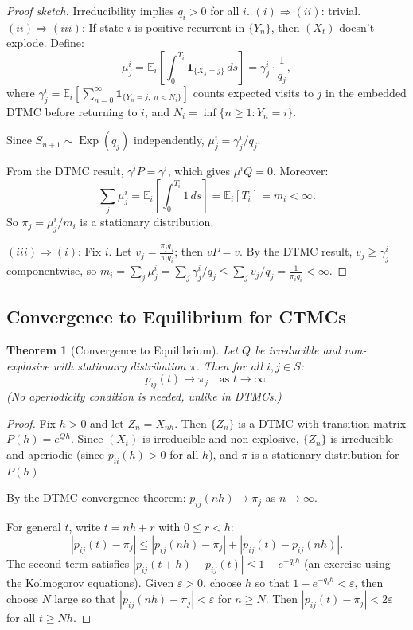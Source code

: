 \documentclass[12pt, a4paper]{article}
\theoremstyle{definition}
\theoremstyle{plain}
\newtheorem{theorem}{Theorem}[section]
\DeclareMathOperator{\Exp}{Exp}
\newcommand{\EE}{\mathbb{E}}
\begin{document}
\begin{proof}[Proof sketch]
Irreducibility implies $q_i > 0$ for all $i$.
$(i) \Rightarrow (ii)$: trivial. $(ii) \Rightarrow (iii)$: If state $i$ is positive recurrent in $\{Y_n\}$, then $(X_t)$ doesn't explode. Define:
\[
\mu_j^i = \EE_i\!\left[\int_0^{T_i} \mathbf{1}_{\{X_s = j\}}\,ds\right] = \gamma_j^i \cdot \frac{1}{q_j},
\]
where $\gamma_j^i = \EE_i\!\left[\sum_{n=0}^\infty \mathbf{1}_{\{Y_n = j,\; n < N_i\}}\right]$ counts expected visits to $j$ in the embedded DTMC before returning to $i$, and $N_i = \inf\{n \ge 1 : Y_n = i\}$.

Since $S_{n+1} \sim \Exp(q_j)$ independently, $\mu_j^i = \gamma_j^i / q_j$.

From the DTMC result, $\gamma^i P = \gamma^i$, which gives $\mu^i Q = 0$.
Moreover:
\[
\sum_j \mu_j^i = \EE_i\!\left[\int_0^{T_i} 1\,ds\right] = \EE_i[T_i] = m_i < \infty.
\]
So $\pi_j = \mu_j^i / m_i$ is a stationary distribution.

$(iii) \Rightarrow (i)$: Fix $i$. Let $v_j = \tfrac{\pi_j q_j}{\pi_i q_i}$; then $vP = v$. By the DTMC result, $v_j \ge \gamma_j^i$ componentwise, so $m_i = \sum_j \mu_j^i = \sum_j \gamma_j^i/q_j \le \sum_j v_j/q_j = \frac{1}{\pi_i q_i} < \infty$.
\end{proof}

\subsection{Convergence to Equilibrium for CTMCs}

\begin{theorem}[Convergence to Equilibrium]
Let $Q$ be irreducible and non-explosive with stationary distribution $\pi$. Then for all $i,j \in S$:
\[
  p_{ij}(t) \to \pi_j \quad \text{as } t \to \infty.
\]
(No aperiodicity condition is needed, unlike in DTMCs.)
\end{theorem}

\begin{proof}
Fix $h > 0$ and let $Z_n = X_{nh}$. Then $\{Z_n\}$ is a DTMC with transition matrix $P(h) = e^{Qh}$. Since $(X_t)$ is irreducible and non-explosive, $\{Z_n\}$ is irreducible and aperiodic (since $p_{ii}(h) > 0$ for all $h$), and $\pi$ is a stationary distribution for $P(h)$.

By the DTMC convergence theorem: $p_{ij}(nh) \to \pi_j$ as $n \to \infty$.

For general $t$, write $t = nh + r$ with $0 \le r < h$:
\[
  |p_{ij}(t) - \pi_j| \le |p_{ij}(nh) - \pi_j| + |p_{ij}(t) - p_{ij}(nh)|.
\]
The second term satisfies $|p_{ij}(t+h) - p_{ij}(t)| \le 1 - e^{-q_i h}$ (an exercise using the Kolmogorov equations). Given $\varepsilon > 0$, choose $h$ so that $1 - e^{-q_i h} < \varepsilon$, then choose $N$ large so that $|p_{ij}(nh) - \pi_j| < \varepsilon$ for $n \ge N$. Then $|p_{ij}(t) - \pi_j| < 2\varepsilon$ for all $t \ge Nh$.
\end{proof}
\end{document}
